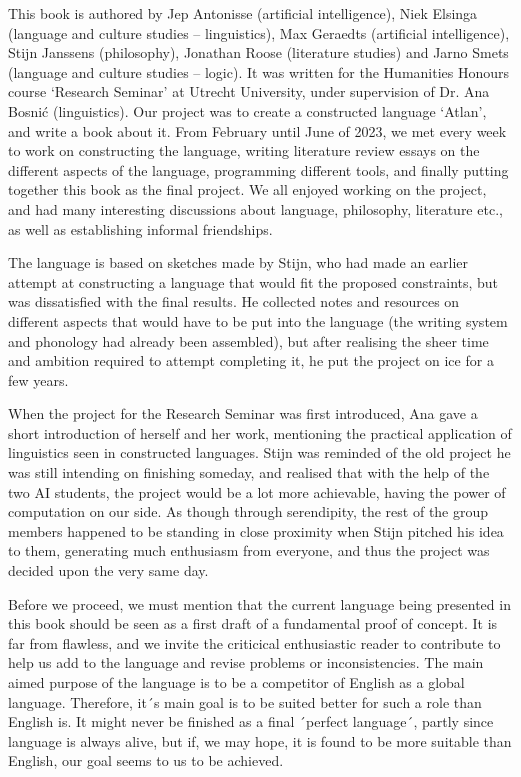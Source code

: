 This book is authored by Jep Antonisse (artificial intelligence), Niek Elsinga (language and culture studies – linguistics), Max Geraedts (artificial intelligence), Stijn Janssens (philosophy), Jonathan Roose (literature studies) and Jarno Smets (language and culture studies – logic). It was written for the Humanities Honours course ‘Research Seminar’ at Utrecht University, under supervision of Dr. Ana Bosnić (linguistics). Our project was to create a constructed language ‘Atlan’, and write a book about it. From February until June of 2023, we met every week to work on constructing the language, writing literature review essays on the different aspects of the language, programming different tools, and finally putting together this book as the final project. We all enjoyed working on the project, and had many interesting discussions about language, philosophy, literature etc., as well as establishing informal friendships. 

The language is based on sketches made by Stijn, who had made an earlier attempt at constructing a language that would fit the proposed constraints, but was dissatisfied with the final results. He collected notes and resources on different aspects that would have to be put into the language (the writing system and phonology had already been assembled), but after realising the sheer time and ambition required to attempt completing it, he put the project on ice for a few years.  

When the project for the Research Seminar was first introduced, Ana gave a short introduction of herself and her work, mentioning the practical application of linguistics seen in constructed languages. Stijn was reminded of the old project he was still intending on finishing someday, and realised that with the help of the two AI students, the project would be a lot more achievable, having the power of computation on our side. As though through serendipity, the rest of the group members happened to be standing in close proximity when Stijn pitched his idea to them, generating much enthusiasm from everyone, and thus the project was decided upon the very same day.  

Before
we proceed, we must mention that the current language being presented in this
book should be seen as a first draft of a fundamental proof of concept. It is
far from flawless, and we invite the criticical enthusiastic reader to
contribute to help us add to the language and revise problems or
inconsistencies. The main aimed purpose of the language is to be a competitor
of English as a global language. Therefore, it´s main goal is to be suited
better for such a role than English is. It might never be finished as a final ´perfect
language´, partly since language is always alive, but if, we may hope, it is
found to be more suitable than English, our goal seems to us to be achieved.

